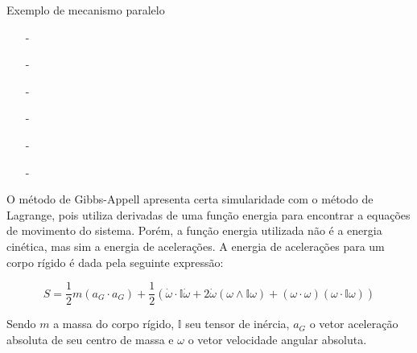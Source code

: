 \documentclass[12pt,a4paper]{article}
\begin{document}
\begin{itemize}
\begin{itemize}
\begin{itemize}
	\end{itemize}
	

	Exemplo de mecanismo paralelo

	\begin{itemize}
	\item[-]
	\item[-]
	\item[-]
	\item[-]
	\item[-]
	\item[-]
	\end{itemize}


\end{itemize}

\end{itemize}





O método de Gibbs-Appell apresenta certa simularidade com o método de Lagrange, pois utiliza derivadas de uma função energia para encontrar a equações de movimento do sistema. Porém, a função energia utilizada não é a energia cinética, mas sim a energia de acelerações. A energia de acelerações para um corpo rígido é dada pela seguinte expressão:

$$ S = \frac{1}{2} m ( a_G \cdot a_G ) + \frac{1}{2}( \dot{\omega} \cdot \mathbb{I} \dot{\omega} + 2 \dot{\omega} (\omega \wedge \mathbb{I} \omega ) + (\omega \cdot \omega)(\omega \cdot \mathbb{I}\omega ) )  $$
 
Sendo $m$ a massa do corpo rígido, $\mathbb{I}$ seu tensor de inércia, $a_G$ o vetor aceleração absoluta de seu centro de massa e $\omega$ o vetor velocidade angular absoluta.  \\
\end{document}
